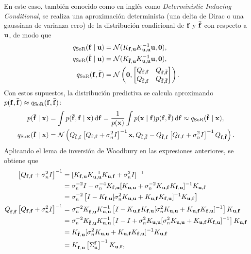 En este caso, también conocido como en inglés como \emph{Deterministic Inducing Conditional}, se realiza una aproximación determinista (una delta de Dirac o una gaussiana de varianza cero) de la distribución condicional de \(\mathbf{f}\) y \(\bar{\mathbf{f}}\) con respecto a \(\mathbf{u}\), de modo que
\begin{align*}
	q_{\mathrm{SoR}}(\mathbf{f} \mid \mathbf{u})		&= \mathcal{N}(K_{\mathbf{f}, \mathbf{u}} K_{\mathbf{u},\mathbf{u}}^{-1} \mathbf{u}, \mathbf{0}), \\
	q_{\mathrm{SoR}}(\bar{\mathbf{f}} \mid \mathbf{u})	&= \mathcal{N}(K_{\bar{\mathbf{f}},\mathbf{u}} K_{\mathbf{u}, \mathbf{u}}^{-1} \mathbf{u}, \mathbf{0}), \\
	q_{\mathrm{SoR}}(\mathbf{f}, \bar{\mathbf{f}})		&= \mathcal{N}\left(\mathbf{0}, \begin{bmatrix}
		Q_{\mathbf{f}, \mathbf{f}} & Q_{\mathbf{f}, \bar{\mathbf{f}}} \\
		Q_{\bar{\mathbf{f}}, \mathbf{f}} & Q_{\bar{\mathbf{f}}, \bar{\mathbf{f}}}
	\end{bmatrix}\right).
\end{align*}
Con estos supuestos, la distribución predictiva se calcula aproximando \(p(\mathbf{f}, \bar{\mathbf{f}}) \approx q_{\mathrm{SoR}}(\mathbf{f}, \bar{\mathbf{f}})\):
\begin{align*}
	p(\bar{\mathbf{f}} \mid \mathbf{x})					&= \int p(\bar{\mathbf{f}}, \mathbf{f} \mid \mathbf{x}) \dd{\mathbf{f}} = \frac{1}{p(\mathbf{x})} \int p(\mathbf{x} \mid \mathbf{f}) p(\mathbf{f}, \bar{\mathbf{f}}) \dd{\mathbf{f}} \approx q_{\mathrm{SoR}}(\bar{\mathbf{f}} \mid \mathbf{x}), \\
	q_{\mathrm{SoR}}(\bar{\mathbf{f}} \mid \mathbf{x})	&= \mathcal{N}\left(Q_{\bar{\mathbf{f}}, \mathbf{f}} \left[Q_{\mathbf{f}, \mathbf{f}} + \sigma_n^2 I\right]^{-1} \mathbf{x}, Q_{\bar{\mathbf{f}}, \bar{\mathbf{f}}} - Q_{\bar{\mathbf{f}}, \mathbf{f}} \left[Q_{\mathbf{f}, \mathbf{f}} + \sigma_n^2 I\right]^{-1} Q_{\mathbf{f}, \bar{\mathbf{f}}}\right).
\end{align*}
Aplicando el lema de inversión de Woodbury en las expresiones anteriores, se obtiene que
\begin{align*}
	\left[ Q_{\mathbf{f}, \mathbf{f}} + \sigma_n^2 I\right]^{-1}	&= [K_{\mathbf{f}, \mathbf{u}} K_{\mathbf{u},\mathbf{u}}^{-1} K_{\mathbf{u}, \mathbf{f}} + \sigma_n^2 I]^{-1} \\
														&= \sigma_n^{-2} I - \sigma_{n}^{-4} K_{\mathbf{f}, \mathbf{u}} [K_{\mathbf{u}, \mathbf{u}} + \sigma_n^{-2} K_{\mathbf{u}, \mathbf{f}} K_{\mathbf{f}, \mathbf{u}}]^{-1} K_{\mathbf{u}, \mathbf{f}} \\
														&= \sigma_n^{-2} \left[I - K_{\mathbf{f}, \mathbf{u}} [\sigma_n^2 K_{\mathbf{u}, \mathbf{u}} + K_{\mathbf{u}, \mathbf{f}} K_{\mathbf{f},\mathbf{u}}]^{-1} K_{\mathbf{u}, \mathbf{f}}\right] \\
	Q_{\bar{\mathbf{f}}, \mathbf{f}}\left[Q_{\mathbf{f}, \mathbf{f}} + \sigma_n^2 I\right]^{-1}	&= \sigma_n^{-2} K_{\bar{\mathbf{f}}, \mathbf{u}} K_{\mathbf{u}, \mathbf{u}}^{-1} \left[I - K_{\mathbf{u}, \mathbf{f}} K_{\mathbf{f},\mathbf{u}} [\sigma_n^2 K_{\mathbf{u}, \mathbf{u}} + K_{\mathbf{u}, \mathbf{f}} K_{\mathbf{f}, \mathbf{u}}]^{-1} \right] K_{\mathbf{u}, \mathbf{f}} \\
																		&= \sigma_n^{-2} K_{\bar{\mathbf{f}}, \mathbf{u}} K_{\mathbf{u}, \mathbf{u}}^{-1} \left[I - I + \sigma_n^2 K_{\mathbf{u}, \mathbf{u}} [\sigma_n^2 K_{\mathbf{u}, \mathbf{u}} + K_{\mathbf{u}, \mathbf{f}} K_{\mathbf{f}, \mathbf{u}}]^{-1} \right] K_{\mathbf{u}, \mathbf{f}} \\
																		&= K_{\bar{\mathbf{f}}, \mathbf{u}} [\sigma_n^2 K_{\mathbf{u}, \mathbf{u}} + K_{\mathbf{u}, \mathbf{f}} K_{\mathbf{f}, \mathbf{u}}]^{-1} K_{\mathbf{u}, \mathbf{f}} \\
																		&= K_{\bar{\mathbf{f}}, \mathbf{u}} \left[\Sigma_{\mathbf{u}}^{\mathbf{f}}\right]^{-1} K_{\mathbf{u}, \mathbf{f}},
\end{align*}
